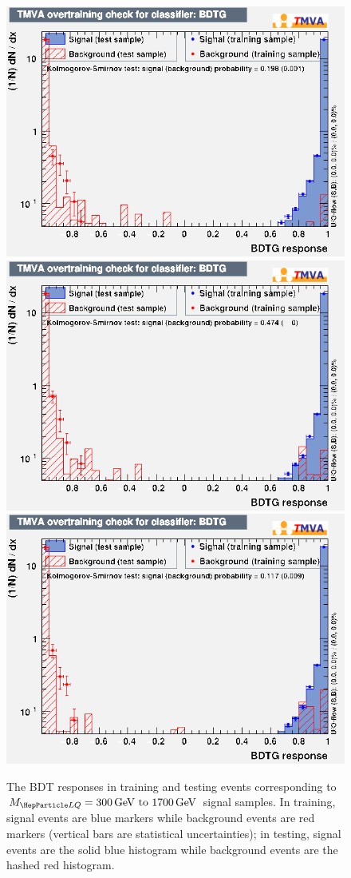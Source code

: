 \begin{figure}[H]
    {\includegraphics[width=.32\textwidth]{Images/Analysis/Results_LQToBMu_pair_uubj_BDTG_FullRun2_2023_01_25_020318/1500/overtrain_BDTG.png}}
    {\includegraphics[width=.32\textwidth]{Images/Analysis/Results_LQToBMu_pair_uubj_BDTG_FullRun2_2023_01_25_020318/1600/overtrain_BDTG.png}}
    {\includegraphics[width=.32\textwidth]{Images/Analysis/Results_LQToBMu_pair_uubj_BDTG_FullRun2_2023_01_25_020318/1700/overtrain_BDTG.png}}
    \caption{The BDT responses in training and testing events corresponding to $\MLQ = \SIrange{300}{1700}{GeV}$ signal samples. In training, signal events are blue markers while background events are red markers (vertical bars are statistical uncertainties); in testing, signal events are the solid blue histogram while background events are the hashed red histogram.}
    \label{figapp:overtraining1}
\end{figure}

